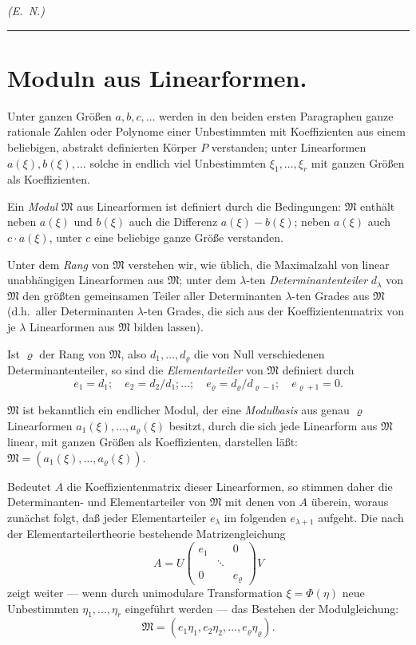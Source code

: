 \documentclass[fontsize=10pt,paper=a5,pagesize,headings=small]{scrbook}
\theoremstyle{plain}
\begin{document}
\hfill\textit{(E.~N.)}

\vspace{6pt}
\noindent\rule{\textwidth}{0.4pt}

\section{Moduln aus Linearformen.}
\setcounter{section}{1}

Unter ganzen Größen $a,b,c,\dots$ werden in den beiden ersten Paragraphen
ganze rationale Zahlen oder Polynome einer Unbestimmten mit Koeffizienten aus einem
beliebigen, abstrakt definierten Körper $P$ verstanden; unter Linearformen $a(\xi), b(\xi),\dots$
solche in endlich viel Unbestimmten $\xi_1,\dots,\xi_r$ mit ganzen Größen als Koeffizienten.

Ein \textit{Modul} $\mathfrak{M}$ aus Linearformen ist definiert durch die Bedingungen:
$\mathfrak{M}$ enthält neben $a(\xi)$ und $b(\xi)$ auch die Differenz $a(\xi) - b(\xi)$; neben
$a(\xi)$ auch $c \cdot a(\xi)$, unter $c$ eine beliebige ganze Größe verstanden.

Unter dem \textit{Rang} von $\mathfrak{M}$ verstehen wir, wie üblich, die Maximalzahl von linear
unabhängigen Linearformen aus $\mathfrak{M}$; unter dem $\lambda$-ten \textit{Determinantenteiler}
$d_\lambda$ von $\mathfrak{M}$ den größten gemeinsamen Teiler aller Determinanten $\lambda$-ten Grades
aus $\mathfrak{M}$ (d.h.~aller Determinanten $\lambda$-ten Grades, die sich aus der Koeffizientenmatrix
von je $\lambda$ Linearformen aus $\mathfrak{M}$ bilden lassen).

Ist $\varrho$ der Rang von $\mathfrak{M}$, also $d_1,\dots,d_\varrho$ die von Null verschiedenen
Determinantenteiler, so sind die \textit{Elementarteiler} von $\mathfrak{M}$ definiert durch
\[ e_1 = d_1;\quad e_2 = d_2/d_1;\dots;\quad e_\varrho = d_\varrho/d_{\varrho-1};\quad e_{\varrho+1} = 0. \]

$\mathfrak{M}$ ist bekanntlich ein endlicher Modul, der eine \textit{Modulbasis} aus genau $\varrho$
Linearformen $a_1(\xi),\dots,a_\varrho(\xi)$ besitzt, durch die sich jede Linearform aus
$\mathfrak{M}$ linear, mit ganzen Größen als Koeffizienten, darstellen läßt:
$\mathfrak{M} = (a_1(\xi),\dots,a_\varrho(\xi))$.

Bedeutet $A$ die Koeffizientenmatrix dieser Linearformen, so stimmen daher die
Determinanten- und Elementarteiler von $\mathfrak{M}$ mit denen von $A$ überein, woraus zunächst
folgt, daß jeder Elementarteiler $e_\lambda$ im folgenden $e_{\lambda+1}$ aufgeht. Die nach der
Elementarteilertheorie bestehende Matrizengleichung
\[ A = U \begin{pmatrix} e_1 && 0 \\ & \ddots & \\ 0 && e_\varrho \end{pmatrix} V \]
zeigt weiter --- wenn durch unimodulare Transformation $\xi = \Phi(\eta)$ neue Unbestimmten
$\eta_1,\dots,\eta_r$ eingeführt werden --- das Bestehen der Modulgleichung:
\begin{equation}
\label{eq:mod1}
\mathfrak{M} = (e_1\eta_1, e_2\eta_2,\dots, e_\varrho\eta_\varrho).
\end{equation}
\end{document}
